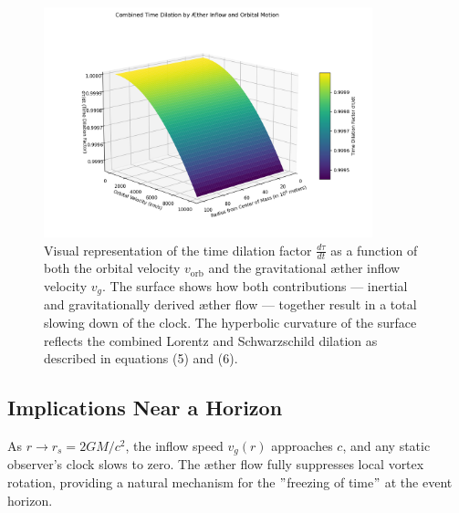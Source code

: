 \begin{figure}[htbp]
    \centering
    \includegraphics[width=0.85\textwidth]{images/09-CombinedTimeDilationSurface}
    \caption{Visual representation of the time dilation factor \( \frac{d\tau}{dt} \) as a function of both the orbital velocity \( v_\text{orb} \) and the gravitational æther inflow velocity \( v_g \). The surface shows how both contributions — inertial and gravitationally derived æther flow — together result in a total slowing down of the clock. The hyperbolic curvature of the surface reflects the combined Lorentz and Schwarzschild dilation as described in equations (5) and (6).}
    \label{fig:TimeDialationCombined}
\end{figure}

\subsection*{Implications Near a Horizon}

As $r \to r_s = 2GM/c^2$, the inflow speed $v_g(r)$ approaches $c$, and any static observer's clock slows to zero. The æther flow fully suppresses local vortex rotation, providing a natural mechanism for the \("\)freezing of time\("\) at the event horizon.

